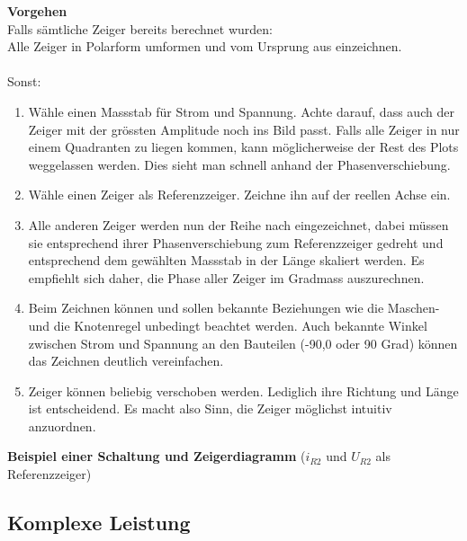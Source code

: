 \textbf{Vorgehen} \\
Falls sämtliche Zeiger bereits berechnet wurden: \\
Alle Zeiger in Polarform umformen und vom Ursprung aus einzeichnen. \\
\\
Sonst: \\
\begin{enumerate}
	\item Wähle einen Massstab für Strom und Spannung. Achte darauf, dass auch der Zeiger mit der grössten Amplitude noch ins Bild passt. Falls alle Zeiger in nur einem Quadranten zu liegen kommen, kann möglicherweise der Rest des Plots weggelassen werden. Dies sieht man schnell anhand der Phasenverschiebung.
	\item Wähle einen Zeiger als Referenzzeiger. Zeichne ihn auf der reellen Achse ein.
	\item Alle anderen Zeiger werden nun der Reihe nach eingezeichnet, dabei müssen sie entsprechend ihrer Phasenverschiebung zum Referenzzeiger gedreht und entsprechend dem gewählten Massstab in der Länge skaliert werden. Es empfiehlt sich daher, die Phase aller Zeiger im Gradmass auszurechnen.
	\item Beim Zeichnen können und sollen bekannte Beziehungen wie die Maschen- und die Knotenregel unbedingt beachtet werden. Auch bekannte Winkel zwischen Strom und Spannung an den Bauteilen (-90,0 oder 90 Grad) können das Zeichnen deutlich vereinfachen.
	\item Zeiger können beliebig verschoben werden. Lediglich ihre Richtung und Länge ist entscheidend. Es macht also Sinn, die Zeiger möglichst intuitiv anzuordnen.
\end{enumerate}


\textbf{Beispiel einer Schaltung und Zeigerdiagramm} ($i_{R2}$ und $U_{R2}$ als Referenzzeiger)
\subsection{Komplexe Leistung}

